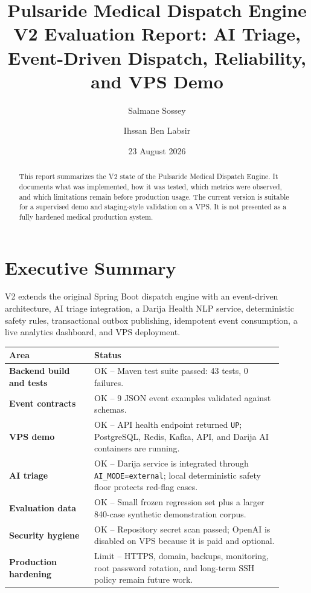 \documentclass[11pt,a4paper]{article}
\title{
  \textbf{Pulsaride Medical Dispatch Engine}\\
  \large V2 Evaluation Report: AI Triage, Event-Driven Dispatch, Reliability, and VPS Demo
}
\author{Salmane Sossey \and Ihssan Ben Labsir}
\date{23 August 2026}
\newcommand{\ok}{\textcolor{PulsarideGreen}{OK}}
\newcommand{\limit}{\textcolor{PulsarideAmber}{Limit}}
\newcommand{\code}[1]{\texttt{#1}}
\begin{document}
\maketitle

\begin{abstract}
This report summarizes the V2 state of the Pulsaride Medical Dispatch Engine. It documents what was implemented, how it was tested, which metrics were observed, and which limitations remain before production usage. The current version is suitable for a supervised demo and staging-style validation on a VPS. It is not presented as a fully hardened medical production system.
\end{abstract}

\tableofcontents
\newpage

\section{Executive Summary}

V2 extends the original Spring Boot dispatch engine with an event-driven architecture, AI triage integration, a Darija Health NLP service, deterministic safety rules, transactional outbox publishing, idempotent event consumption, a live analytics dashboard, and VPS deployment.

\begin{longtable}{>{\bfseries}p{0.28\linewidth}p{0.62\linewidth}}
\toprule
Area & Status \\
\midrule
Backend build and tests & \ok{} -- Maven test suite passed: 43 tests, 0 failures. \\
Event contracts & \ok{} -- 9 JSON event examples validated against schemas. \\
VPS demo & \ok{} -- API health endpoint returned \code{UP}; PostgreSQL, Redis, Kafka, API, and Darija AI containers are running. \\
AI triage & \ok{} -- Darija service is integrated through \code{AI\_MODE=external}; local deterministic safety floor protects red-flag cases. \\
Evaluation data & \ok{} -- Small frozen regression set plus a larger 840-case synthetic demonstration corpus. \\
Security hygiene & \ok{} -- Repository secret scan passed; OpenAI is disabled on VPS because it is paid and optional. \\
Production hardening & \limit{} -- HTTPS, domain, backups, monitoring, root password rotation, and long-term SSH policy remain future work. \\
\bottomrule
\end{longtable}
\end{document}
